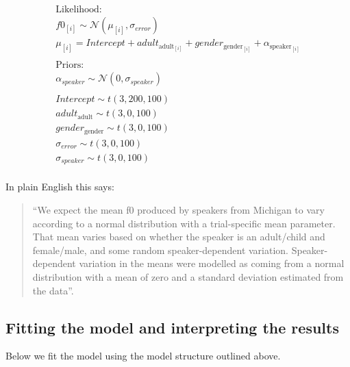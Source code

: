 \documentclass[
]{book}
\begin{document}
\begin{equation}
\begin{split}
\textrm{Likelihood:} \\
f0_{[i]} \sim \mathcal{N}(\mu_{[i]},\sigma_{error}) \\
\mu_{[i]} = Intercept + adult_{\mathrm{adult}_{[i]}}+gender_{\mathrm{gender}_{[i]}} + \alpha_{\mathrm{speaker}_{[i]}} \\\\
\textrm{Priors:} \\
\alpha_{speaker} \sim \mathcal{N}(0,\sigma_{speaker}) \\ \\ 
Intercept \sim t(3, 200, 100) \\ 
adult_{\mathrm{adult}} \sim t(3, 0, 100) \\ 
gender_{\mathrm{gender}} \sim t(3, 0, 100) \\ 
\sigma_{error} \sim t(3, 0, 100) \\
\sigma_{speaker} \sim t(3, 0, 100) \\ 
\end{split}
\label{eq:42}
\end{equation}

In plain English this says:

\begin{quote}
``We expect the mean f0 produced by speakers from Michigan to vary according to a normal distribution with a trial-specific mean parameter. That mean varies based on whether the speaker is an adult/child and female/male, and some random speaker-dependent variation. Speaker-dependent variation in the means were modelled as coming from a normal distribution with a mean of zero and a standard deviation estimated from the data''.
\end{quote}

\hypertarget{fitting-the-model-and-interpreting-the-results}{%
\subsection{Fitting the model and interpreting the results}\label{fitting-the-model-and-interpreting-the-results}}

Below we fit the model using the model structure outlined above.
\end{document}
